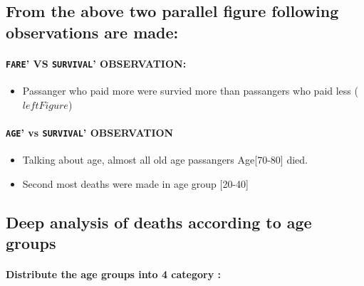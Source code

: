 \documentclass[11pt]{article}
\providecommand{\tightlist}{%
      \setlength{\itemsep}{0pt}\setlength{\parskip}{0pt}}
\begin{document}
    \hypertarget{from-the-above-two-parallel-figure-following-observations-are-made}{%
\subsection{From the above two parallel figure following observations
are
made:}\label{from-the-above-two-parallel-figure-following-observations-are-made}}

\hypertarget{fare-vs-survival-observation}{%
\paragraph{\texorpdfstring{\texttt{\textquotesingle{}FARE}' VS
\texttt{\textquotesingle{}SURVIVAL}'
OBSERVATION:}{'FARE' VS 'SURVIVAL' OBSERVATION:}}\label{fare-vs-survival-observation}}

\begin{itemize}
\tightlist
\item
  Passanger who paid more were survied more than passangers who paid
  less (\(left Figure\))
\end{itemize}

\hypertarget{age-vs-survival-observation}{%
\paragraph{\texorpdfstring{\texttt{\textquotesingle{}AGE}' vs
\texttt{\textquotesingle{}SURVIVAL}'
OBSERVATION}{'AGE' vs 'SURVIVAL' OBSERVATION}}\label{age-vs-survival-observation}}

\begin{itemize}
\tightlist
\item
  Talking about age, almost all old age passangers Age{[}70-80{]} died.
\item
  Second most deaths were made in age group {[}20-40{]}
\end{itemize}

    \hypertarget{deep-analysis-of-deaths-according-to-age-groups}{%
\subsection{Deep analysis of deaths according to age
groups}\label{deep-analysis-of-deaths-according-to-age-groups}}

\hypertarget{distribute-the-age-groups-into-4-category}{%
\paragraph{Distribute the age groups into 4 category
:}\label{distribute-the-age-groups-into-4-category}}
\end{document}
